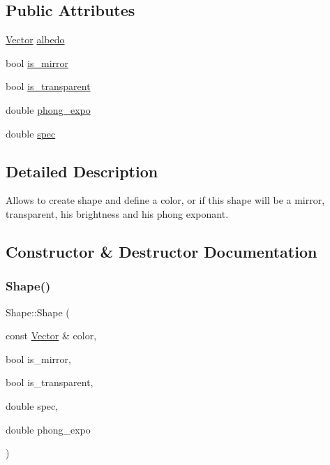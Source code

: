 \subsection*{Public Attributes}
\begin{DoxyCompactItemize}
\item 
\hyperlink{classVector}{Vector} \hyperlink{classShape_afc030a51120dade6f5c5b90c2d60087e}{albedo}
\item 
bool \hyperlink{classShape_a0ead7657fa5e4c7862fe1cedd670a9e5}{is\+\_\+mirror}
\item 
bool \hyperlink{classShape_ab8da3fc4606e66dea941ec23d25f53ef}{is\+\_\+transparent}
\item 
double \hyperlink{classShape_a2556fca106f9503e6dfb4da703c28f7f}{phong\+\_\+expo}
\item 
double \hyperlink{classShape_a60ef96ac5dea3478fdd1ab320e4c3bef}{spec}
\end{DoxyCompactItemize}


\subsection{Detailed Description}
Allows to create shape and define a color, or if this shape will be a mirror, transparent, his brightness and his phong exponant. 

\subsection{Constructor \& Destructor Documentation}
\mbox{\label{classShape_ac15c3dd4d56ded4efccf75f820cce913}} 
\subsubsection{\texorpdfstring{Shape()}{Shape()}}
{\footnotesize\ttfamily Shape\+::\+Shape (\begin{DoxyParamCaption}\item[{const \hyperlink{classVector}{Vector} \&}]{color,  }\item[{bool}]{is\+\_\+mirror,  }\item[{bool}]{is\+\_\+transparent,  }\item[{double}]{spec,  }\item[{double}]{phong\+\_\+expo }\end{DoxyParamCaption})\hspace{0.3cm}{\ttfamily [inline]}}



